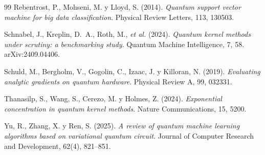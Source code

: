\documentclass[a4paper,10pt,twocolumn]{article}
\begin{document}
\begin{thebibliography}{99}
Rebentrost, P., Mohseni, M. y Lloyd, S. (2014).
\textit{Quantum support vector machine for big data classification}.
Physical Review Letters, 113, 130503.

Schnabel, J., Kreplin, D.~A., Roth, M., \emph{et al.} (2024).
\textit{Quantum kernel methods under scrutiny: a benchmarking study}.
Quantum Machine Intelligence, 7, 58. arXiv:2409.04406.

Schuld, M., Bergholm, V., Gogolin, C., Izaac, J. y Killoran, N. (2019).
\textit{Evaluating analytic gradients on quantum hardware}.
Physical Review A, 99, 032331.

Thanasilp, S., Wang, S., Cerezo, M. y Holmes, Z. (2024).
\textit{Exponential concentration in quantum kernel methods}.
Nature Communications, 15, 5200.

Yu, R., Zhang, X. y Ren, S. (2025).
\textit{A review of quantum machine learning algorithms based on
variational quantum circuit}.
Journal of Computer Research and Development, 62(4), 821--851.

\end{thebibliography}
\end{document}
